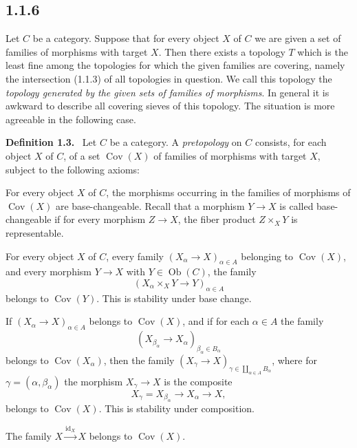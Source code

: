 \documentclass[11pt]{article}
\newcommand{\ob}{\operatorname{Ob}}
\newcommand{\Cov}{\operatorname{Cov}}
\newcommand{\id}{\operatorname{id}}
\newenvironment{statement}[1]{\par\medskip\noindent\textbf{#1.}\ }{\par\medskip}
\begin{document}
\subsection*{1.1.6}
Let \(C\) be a category. Suppose that for every object \(X\) of \(C\) we are given a set of families of morphisms with target \(X\). Then there exists a topology \(T\) which is the least fine among the topologies for which the given families are covering, namely the intersection (1.1.3) of all topologies in question. We call this topology the \emph{topology generated by the given sets of families of morphisms}. In general it is awkward to describe all covering sieves of this topology. The situation is more agreeable in the following case.

\begin{statement}{Definition 1.3}
Let \(C\) be a category. A \emph{pretopology} on \(C\) consists, for each object \(X\) of \(C\), of a set \(\Cov(X)\) of families of morphisms with target \(X\), subject to the following axioms:
\begin{description}[leftmargin=3.2em,style=nextline]
\item[PT 0)] For every object \(X\) of \(C\), the morphisms occurring in the families of morphisms of \(\Cov(X)\) are base-changeable. Recall that a morphism \(Y\to X\) is called base-changeable if for every morphism \(Z\to X\), the fiber product \(Z\times_XY\) is representable.

\item[PT 1)] For every object \(X\) of \(C\), every family \((X_\alpha\to X)_{\alpha\in A}\) belonging to \(\Cov(X)\), and every morphism \(Y\to X\) with \(Y\in\ob(C)\), the family
\[
(X_\alpha\times_XY\to Y)_{\alpha\in A}
\]
belongs to \(\Cov(Y)\). This is stability under base change.

\item[PT 2)] If \((X_\alpha\to X)_{\alpha\in A}\) belongs to \(\Cov(X)\), and if for each \(\alpha\in A\) the family
\[
(X_{\beta_\alpha}\to X_\alpha)_{\beta_\alpha\in B_\alpha}
\]
belongs to \(\Cov(X_\alpha)\), then the family \((X_\gamma\to X)_{\gamma\in\coprod_{\alpha\in A}B_\alpha}\), where for \(\gamma=(\alpha,\beta_\alpha)\) the morphism \(X_\gamma\to X\) is the composite
\[
X_\gamma=X_{\beta_\alpha}\to X_\alpha\to X,
\]
belongs to \(\Cov(X)\). This is stability under composition.

\item[PT 3)] The family \(X\xrightarrow{\id_X}X\) belongs to \(\Cov(X)\).
\end{description}
\end{statement}
\end{document}

